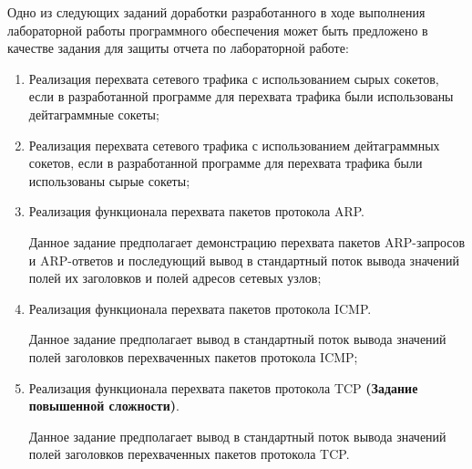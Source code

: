 
Одно из следующих заданий доработки разработанного в ходе выполнения лабораторной работы программного обеспечения
может быть предложено в качестве задания для защиты отчета по лабораторной работе:

\begin{enumerate}

	\item Реализация перехвата сетевого трафика с использованием сырых сокетов, если в разработанной программе
	для перехвата трафика были использованы дейтаграммные сокеты;

	\item Реализация перехвата сетевого трафика с использованием дейтаграммных сокетов, если в разработанной программе
	для перехвата трафика были использованы сырые сокеты;

	\item Реализация функционала перехвата пакетов протокола ARP.

		Данное задание предполагает демонстрацию перехвата пакетов ARP-запросов и ARP-ответов и
		последующий вывод в стандартный поток вывода значений полей их заголовков и полей адресов сетевых узлов;

	\item Реализация функционала перехвата пакетов протокола ICMP.

		Данное задание предполагает вывод в стандартный поток вывода значений полей заголовков перехваченных
		пакетов протокола ICMP;

	\item Реализация функционала перехвата пакетов протокола TCP {\bf(Задание повышенной сложности)}.

		Данное задание предполагает вывод в стандартный поток вывода значений полей заголовков перехваченных
		пакетов протокола TCP.

\end{enumerate}

